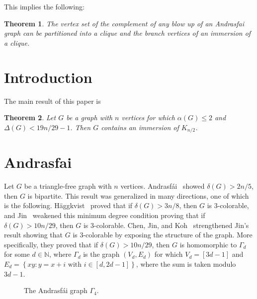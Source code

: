\documentclass[a4paper,12pt]{article}
\newtheorem{theorem}{Theorem}
\begin{document}
This implies the following: 

\begin{theorem}
 The vertex set of the complement of any blow up of an Andrasfai graph can be partitioned 
 into a clique and the branch vertices of an immersion of a clique. 
\end{theorem}

\section{Introduction}

The main result of this paper is

\begin{theorem}\label{thm:main}
Let \(G\) be a graph with \(n\) vertices for which \(\alpha(G) \leq 2\) and \(\Delta(G) < 19n/29 - 1\).
Then \(G\) contains an immersion of \(K_{n/2}\).
\end{theorem}

\section{Andrasfai}



\newcommand{\andrasfai}{Andrasf\'ai}

Let \(G\) be a triangle-free graph with \(n\) vertices.
\andrasfai~\cite{andrasfal1964graphentheoretische} showed \(\delta(G) > 2n/5\),
then \(G\) is bipartite.
This result was generalized in many directions,
one of which is the following.
%
H{\"a}ggkvist~\cite{haggkvist1982odd} proved that if \(\delta(G) > 3n/8\), 
then \(G\) is \(3\)-colorable,
%
and Jin~\cite{jin1995triangle} weakened this minimum degree condition 
proving that if \(\delta(G) > 10n/29\), 
then \(G\) is \(3\)-colorable.
%
Chen, Jin, and Koh~\cite{chen1997triangle} strengthened Jin's result
showing that \(G\) is \(3\)-colorable by exposing the structure of the graph.
More specifically, they proved that if \(\delta(G) > 10n/29\),
then \(G\) is homomorphic to \(\Gamma_d\) for some \(d\in\mathbb{N}\),
where \(\Gamma_d\) is the graph \((V_d,E_d)\)
for which \(V_d = [3d-1]\) and \(E_d = \left\{xy : y = x + i \text{ with } i \in [d,2d-1]\right\}\),
where the sum is taken modulo \(3d-1\).

\begin{figure}[ht]
    \centering
        \centering
    \caption{The Andrasfái graph $\Gamma_4$.}
    \label{fig:andrasfai_graph}
\end{figure}
\end{document}
